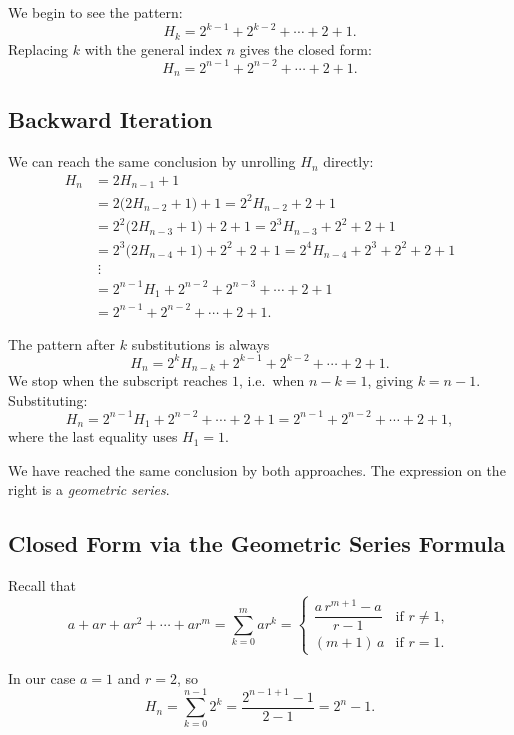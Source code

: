 \documentclass[12pt, a4paper]{article}
\theoremstyle{definition}
\theoremstyle{plain}
\theoremstyle{remark}
\begin{document}
We begin to see the pattern:
\[
  H_k = 2^{k-1} + 2^{k-2} + \cdots + 2 + 1.
\]
Replacing $k$ with the general index $n$ gives the closed form:
\[
  H_n = 2^{n-1} + 2^{n-2} + \cdots + 2 + 1.
\]

\subsection{Backward Iteration}

We can reach the same conclusion by unrolling $H_n$ directly:
\begin{align*}
  H_n &= 2H_{n-1} + 1 \\
      &= 2\bigl(2H_{n-2}+1\bigr) + 1
       = 2^2 H_{n-2} + 2 + 1 \\
      &= 2^2\bigl(2H_{n-3}+1\bigr) + 2 + 1
       = 2^3 H_{n-3} + 2^2 + 2 + 1 \\
      &= 2^3\bigl(2H_{n-4}+1\bigr) + 2^2 + 2 + 1
       = 2^4 H_{n-4} + 2^3 + 2^2 + 2 + 1 \\
      &\;\vdots \\
      &= 2^{n-1} H_1 + 2^{n-2} + 2^{n-3} + \cdots + 2 + 1 \\
      &= 2^{n-1} + 2^{n-2} + \cdots + 2 + 1.
\end{align*}

The pattern after $k$ substitutions is always
\[
  H_n = 2^k H_{n-k} + 2^{k-1} + 2^{k-2} + \cdots + 2 + 1.
\]
We stop when the subscript reaches $1$, i.e.\
when $n - k = 1$, giving $k = n - 1$. Substituting:
\[
  H_n = 2^{n-1} H_1 + 2^{n-2} + \cdots + 2 + 1 = 2^{n-1} + 2^{n-2} + \cdots + 2 + 1,
\]
where the last equality uses $H_1 = 1$.

\medskip

We have reached the same conclusion by both approaches.
The expression on the right is a \emph{geometric series}.

\subsection{Closed Form via the Geometric Series Formula}

Recall that
\[
  a + ar + ar^2 + \cdots + ar^m
  = \sum_{k=0}^{m} ar^k
  = \begin{cases}
      \dfrac{a\,r^{m+1} - a}{r - 1} & \text{if } r \ne 1, \\[8pt]
      (m+1)\,a                       & \text{if } r = 1.
    \end{cases}
\]

In our case $a = 1$ and $r = 2$, so
\[
  H_n
  = \sum_{k=0}^{n-1} 2^k
  = \frac{2^{n-1+1} - 1}{2 - 1}
  = 2^n - 1.
\]
\end{document}
